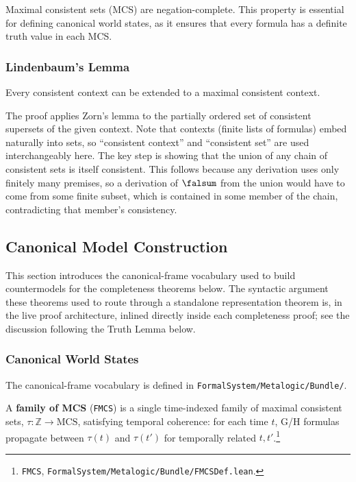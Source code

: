 \documentclass[../BimodalReference.tex]{subfiles}
\begin{document}
Maximal consistent sets (MCS) are negation-complete.
This property is essential for defining canonical world states, as it ensures that every formula has a definite truth value in each MCS.

\subsubsection{Lindenbaum's Lemma}

\begin{lemma}
Every consistent context can be extended to a maximal consistent context.
\end{lemma}

The proof applies Zorn's lemma to the partially ordered set of consistent supersets of the given context.
Note that contexts (finite lists of formulas) embed naturally into sets, so ``consistent context'' and ``consistent set'' are used interchangeably here.
The key step is showing that the union of any chain of consistent sets is itself consistent.
This follows because any derivation uses only finitely many premises, so a derivation of $\falsum$ from the union would have to come from some finite subset, which is contained in some member of the chain, contradicting that member's consistency.

\subsection{Canonical Model Construction}

This section introduces the canonical-frame vocabulary used to build countermodels for the completeness theorems below.
The syntactic argument these theorems used to route through a standalone representation theorem is, in the live proof architecture, inlined directly inside each completeness proof; see the discussion following the Truth Lemma below.

\subsubsection{Canonical World States}

The canonical-frame vocabulary is defined in \texttt{FormalSystem/Metalogic/Bundle/}.

\begin{definition}
A \textbf{family of MCS} (\texttt{FMCS}) is a single time-indexed family of maximal consistent sets, $\tau : \mathbb{Z} \to \text{MCS}$, satisfying temporal coherence: for each time $t$, G/H formulas propagate between $\tau(t)$ and $\tau(t')$ for temporally related $t, t'$.\footnote{\texttt{FMCS}, \texttt{FormalSystem/Metalogic/Bundle/FMCSDef.lean}.}
\end{definition}
\end{document}
